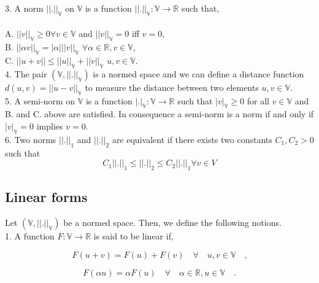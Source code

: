 \documentclass[a4paper,twoside,openright]{book}
\begin{document}
\begin{appendices}
3. A norm $||.||_\mathbb{V}$ on $\mathbb{V}$ is a function $||.||_\mathbb{V} : \mathbb{V} \rightarrow \mathbb{R}$ such that,
\\ 
\\
A. $||v||_\mathbb{V} \geq 0 \forall v \in \mathbb{V}$ and $||v||_\mathbb{V} = 0$ iff $v=0$,\\
B. $||\alpha v||_\mathbb{V} = |\alpha| ||v||_\mathbb{V}$  $\forall \alpha \in \mathbb{R}, v \in \mathbb{V}$,\\
C. $||u+v|| \leq ||u||_\mathbb{V} + ||v||_\mathbb{V}$ $u,v \in \mathbb{V}$.\\

4. The pair $(\mathbb{V},||.||_\mathbb{V})$ is a normed space and we can define a distance function $d(u,v) = ||u-v||_\mathbb{V}$ to measure the distance between two elements $u,v \in \mathbb{V}$.\\

5. A semi-norm on $\mathbb{V}$ is a function $|.|_\mathbb{V} : \mathbb{V} \rightarrow \mathbb{R}$ such that $|v|_\mathbb{V} \geq 0$ for all $v \in \mathbb{V}$ and B. and C. above are satisfied. In consequence a semi-norm is a norm if and only if $|v|_\mathbb{V} = 0$ implies  $v = 0$.\\

6. Two norms $||.||_1$ and $||.||_2$ are equivalent if there exists two constants $C_1,C_2 > 0$ such that \\

\begin{equation} \label{norm_equivalent}
C_1||.||_1 \leq ||.||_2 \leq C_2 ||.||_1 \forall v \in V
\end{equation}

\subsection{Linear forms}

Let $(\mathbb{V,||.||_\mathbb{V}})$ be a normed space. Then, we define the following notions.\\

1. A function $F : \mathbb{V} \rightarrow \mathbb{R}$ is said to be linear if,

\begin{equation} 
F(u+v) = F(u) + F(v) \quad \forall \quad u,v \in \mathbb{V} \quad \textrm{,}
\end{equation}

\begin{equation} 
F(\alpha u) = \alpha F(u) \quad \forall \quad \alpha \in \mathbb{R}, u \in \mathbb{V} \quad \textrm{.}
\end{equation}


\end{appendices}
\end{document}
